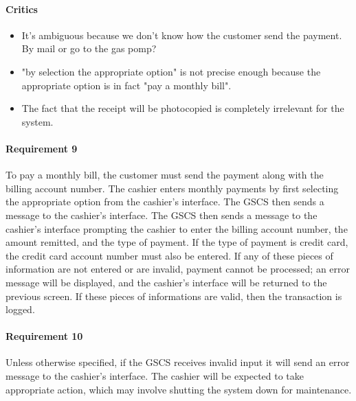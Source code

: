 \documentclass[11pt, a4paper]{article}
\begin{document}
\begin{framed}
    \paragraph{Critics} 
    \begin{itemize}
        \item It's ambiguous because we don't know how the customer send
            the payment. By mail or go to the gas pomp?

        \item "by selection the appropriate option" is not precise
            enough because the appropriate option is in fact "pay a
            monthly bill".

        \item The fact that the receipt will be photocopied is
            completely irrelevant for the system.
    \end{itemize}

    \paragraph{Requirement 9} To pay a monthly bill, the customer must send
    the payment along with the billing account number. The cashier enters
    monthly payments by first selecting the appropriate option from the
    cashier's interface. The GSCS then sends a message to the cashier's
    interface. The GSCS then sends a message to the cashier's interface
    prompting the cashier to enter the billing account number, the amount
    remitted, and the type of payment.
    If the type of payment is credit card, the credit
    card account number must also be entered.
    If any of these pieces of information
    are not entered or are invalid, payment cannot be processed; an error
    message will be displayed, and the cashier's interface will be returned
    to the previous screen. 
    If these pieces of informations are valid, then the transaction is logged.
\end{framed}

\paragraph{Requirement 10} Unless otherwise specified, if the GSCS receives
invalid input it will send an error message to the cashier's interface.
The cashier will be expected to take appropriate action, which may
involve shutting the system down for maintenance.
\end{document}
